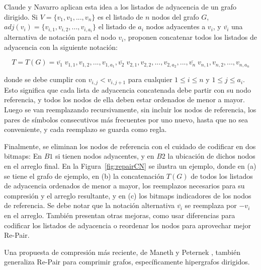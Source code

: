 

Claude y Navarro \cite{claude2010fast} aplican esta idea a los listados de adyacencia de un grafo dirigido. Si $V = \{v_{1}, v_{1}, ..., v_{n}\}$ es el listado de $n$ nodos del grafo $G$, $adj(v_{i}) = \{v_{i,1}, v_{i,2},... , v_{i,a_{i}}\}$ el listado de $a_{i}$ nodos adyacentes a $v_{i}$, y $\overline{v_{i}}$ una alternativa de notación para el nodo $v_{i}$, proponen concatenar todos los listados de adyacencia con la siguiente notación:

\begin{equation} \label{eq:RepairGrafo}
	T = T(G) = \overline{v_{1}} \; v_{1,1}, v_{1,2}, ..., v_{1,a_{1}}, \overline{v_{2}} \; v_{2,1}, v_{2,2}, ..., v_{2,a_{2}}, ..., \overline{v_{n}} \; v_{n,1}, v_{n,2}, ..., v_{n,a_{n}}
\end{equation}

\noindent donde se debe cumplir con $v_{i,j} < v_{i, j+1}$ para cualquier $1 \leq i \leq n$ y $1 \leq j \leq a_{i}$. Esto significa que cada lista de adyacencia concatenada debe partir con su nodo referencia, y todos los nodos de ella deben estar ordenados de menor a mayor. Luego se van reemplazando recursivamente, sin incluir los nodos de referencia, los pares de símbolos consecutivos más frecuentes por uno nuevo, hasta que no sea conveniente, y cada reemplazo se guarda como regla. 

Finalmente, se eliminan los nodos de referencia con el cuidado de codificar en dos bitmaps: En $B1$ si tienen nodos adyacentes, y en $B2$ la ubicación de dichos nodos en el arreglo final. En la Figura~\ref{fig:repairCN} se ilustra un ejemplo, donde en (a) se tiene el grafo de ejemplo, en (b) la concatenación $T(G)$ de todos los listados de adyacencia ordenados de menor a mayor, los reemplazos necesarios para su compresión y el arreglo resultante, y en (c) los bitmaps indicadores de los nodos de referencia. Se debe notar que la notación alternativa $\overline{v_{i}}$ se reemplaza por $-v_{i}$ en el arreglo. También presentan otras mejoras, como usar diferencias para codificar los listados de adyacencia o reordenar los nodos para aprovechar mejor Re-Pair.



Una propuesta de compresión más reciente, de Maneth y Peternek \cite{maneth2016compressing}, también generaliza Re-Pair para comprimir grafos, específicamente hipergrafos dirigidos.



